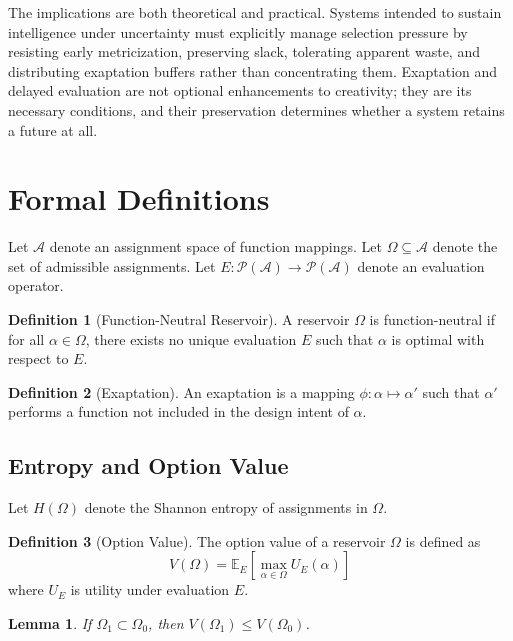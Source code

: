 \documentclass[11pt]{article}
\newtheorem{lemma}{Lemma}
\theoremstyle{definition}
\newtheorem{definition}{Definition}
\begin{document}
The implications are both theoretical and practical. Systems intended to sustain intelligence under uncertainty must explicitly manage selection pressure by resisting early metricization, preserving slack, tolerating apparent waste, and distributing exaptation buffers rather than concentrating them. Exaptation and delayed evaluation are not optional enhancements to creativity; they are its necessary conditions, and their preservation determines whether a system retains a future at all.

\newpage
\appendix
\section{Formal Definitions}

Let $\mathcal{A}$ denote an assignment space of function mappings.
Let $\Omega \subseteq \mathcal{A}$ denote the set of admissible assignments.
Let $E:\mathcal{P}(\mathcal{A}) \to \mathcal{P}(\mathcal{A})$ denote an evaluation operator.

\begin{definition}[Function-Neutral Reservoir]
A reservoir $\Omega$ is function-neutral if for all $\alpha \in \Omega$, there exists no unique evaluation $E$ such that $\alpha$ is optimal with respect to $E$.
\end{definition}

\begin{definition}[Exaptation]
An exaptation is a mapping $\phi:\alpha \mapsto \alpha'$ such that $\alpha'$ performs a function not included in the design intent of $\alpha$.
\end{definition}

\subsection{Entropy and Option Value}

Let $H(\Omega)$ denote the Shannon entropy of assignments in $\Omega$.

\begin{definition}[Option Value]
The option value of a reservoir $\Omega$ is defined as
\[
V(\Omega) = \mathbb{E}_{E} \left[ \max_{\alpha \in \Omega} U_E(\alpha) \right]
\]
where $U_E$ is utility under evaluation $E$.
\end{definition}

\begin{lemma}
If $\Omega_1 \subset \Omega_0$, then $V(\Omega_1) \leq V(\Omega_0)$.
\end{lemma}
\end{document}
